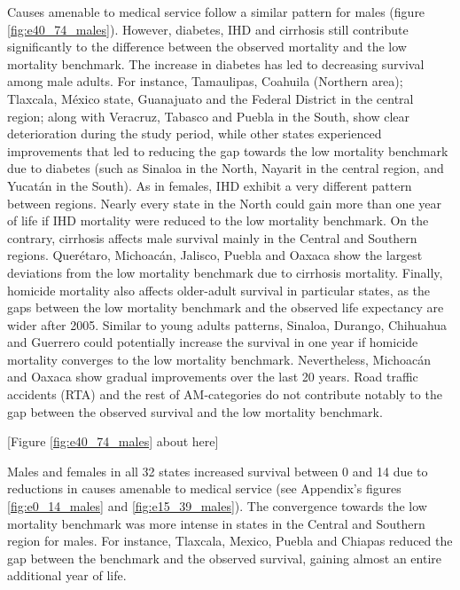\documentclass[11.5pt]{article}
\begin{document}
\begin{spacing}{1.5}
Causes amenable to medical service follow a similar pattern for males (figure  \ref{fig:e40_74_males}). However, diabetes, IHD and cirrhosis still contribute significantly to the difference between the observed mortality and the low mortality benchmark. The increase in diabetes has led to decreasing survival among male adults. For instance,  Tamaulipas, Coahuila (Northern area); Tlaxcala, M\'exico state, Guanajuato and the Federal District in the central region; along with Veracruz, Tabasco and Puebla in the South, show clear deterioration during the study period, while other states experienced improvements that led to reducing the gap towards the low mortality benchmark due to diabetes (such as Sinaloa in the North, Nayarit in the central region, and Yucat\'an in the South). As in females, IHD exhibit a very different pattern between regions. Nearly every state in the North could gain more than one year of life if IHD mortality were reduced to the low mortality benchmark. On the contrary, cirrhosis affects male survival mainly in the Central and Southern regions. Quer\'etaro, Michoac\'an, Jalisco, Puebla and Oaxaca show the largest deviations from the low mortality benchmark due to cirrhosis mortality. Finally, homicide mortality also affects older-adult survival in particular states, as the gaps between the low mortality benchmark and the observed life expectancy are wider after 2005. Similar to young adults patterns, Sinaloa, Durango, Chihuahua and Guerrero could potentially increase the survival in one year if homicide mortality converges to the low mortality benchmark. Nevertheless,  Michoac\'an and Oaxaca show gradual improvements over the last 20 years. Road traffic accidents (RTA) and the rest of AM-categories do not contribute notably to the gap between the observed survival and the low mortality benchmark. \\

\begin{center}
[Figure \ref{fig:e40_74_males} about here]
\end{center}


Males and females in all 32 states increased survival between 0 and 14 due to reductions in causes amenable to medical service (see Appendix's figures  \ref{fig:e0_14_males} and \ref{fig:e15_39_males}). The convergence towards the low mortality benchmark was more intense in states in the Central and Southern region for males. For instance, Tlaxcala, Mexico, Puebla and Chiapas reduced the gap between the benchmark and the observed survival, gaining almost an entire additional year of life. 


\end{spacing}
\end{document}
